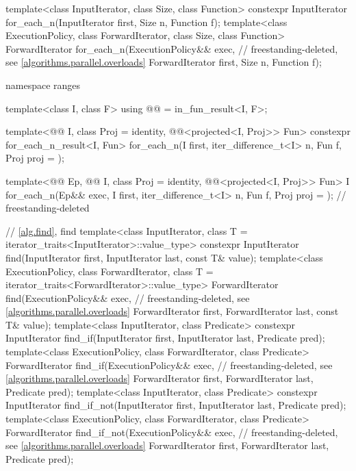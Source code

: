 \begin{codeblock}
{  template<class InputIterator, class Size, class Function>
    constexpr InputIterator for_each_n(InputIterator first, Size n, Function f);
  template<class ExecutionPolicy, class ForwardIterator, class Size, class Function>
    ForwardIterator for_each_n(ExecutionPolicy&& exec,          // freestanding-deleted, see \ref{algorithms.parallel.overloads}
                               ForwardIterator first, Size n, Function f);

  namespace ranges {
    template<class I, class F>
      using @@ = in_fun_result<I, F>;

    template<@@ I, class Proj = identity,
             @@<projected<I, Proj>> Fun>
      constexpr for_each_n_result<I, Fun>
        for_each_n(I first, iter_difference_t<I> n, Fun f, Proj proj = {});

    template<@@ Ep, @@ I, class Proj = identity,
             @@<projected<I, Proj>> Fun>
      I for_each_n(Ep&& exec, I first, iter_difference_t<I> n, Fun f,
                   Proj proj = {});                             // freestanding-deleted
  }

  // \ref{alg.find}, find
  template<class InputIterator, class T = iterator_traits<InputIterator>::value_type>
    constexpr InputIterator find(InputIterator first, InputIterator last,
                                 const T& value);
  template<class ExecutionPolicy, class ForwardIterator,
           class T = iterator_traits<ForwardIterator>::value_type>
    ForwardIterator find(ExecutionPolicy&& exec,                // freestanding-deleted, see \ref{algorithms.parallel.overloads}
                         ForwardIterator first, ForwardIterator last,
                         const T& value);
  template<class InputIterator, class Predicate>
    constexpr InputIterator find_if(InputIterator first, InputIterator last,
                                    Predicate pred);
  template<class ExecutionPolicy, class ForwardIterator, class Predicate>
    ForwardIterator find_if(ExecutionPolicy&& exec,             // freestanding-deleted, see \ref{algorithms.parallel.overloads}
                            ForwardIterator first, ForwardIterator last,
                            Predicate pred);
  template<class InputIterator, class Predicate>
    constexpr InputIterator find_if_not(InputIterator first, InputIterator last,
                                        Predicate pred);
  template<class ExecutionPolicy, class ForwardIterator, class Predicate>
    ForwardIterator find_if_not(ExecutionPolicy&& exec,         // freestanding-deleted, see \ref{algorithms.parallel.overloads}
                                ForwardIterator first, ForwardIterator last,
                                Predicate pred);

}
\end{codeblock}
